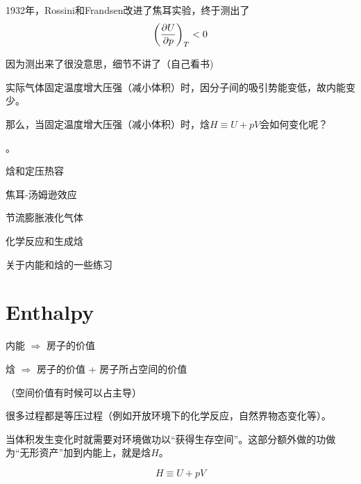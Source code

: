\documentclass[CJK]{beamer}
\begin{document}
\begin{frame}
\bch
1932年，Rossini和Frandsen改进了焦耳实验，终于测出了
$$\left(\frac{\partial U}{\partial p}\right)_{T} < 0 $$

因为测出来了很没意思，细节不讲了（自己看书\bye)
\ech
\end{frame}


\begin{frame}
\bch
实际气体固定温度增大压强（减小体积）时，因分子间的吸引势能变低，故内能变少。


那么，当固定温度增大压强（减小体积）时，焓$H\equiv U + pV$会如何变化呢？

\skipline

。

\ech
\end{frame}


\begin{frame}
\bch
\bitem
\item{焓和定压热容}
\item{焦耳-汤姆逊效应}
\item{节流膨胀液化气体}
\item{化学反应和生成焓}
\item{关于内能和焓的一些练习}
\eitem
\ech
\end{frame}

\section{Enthalpy}

\begin{frame}
\bch


\ech
\end{frame}

\begin{frame}
\bch

内能 $\Rightarrow$ 房子的价值

\skipline

焓 $\Rightarrow$ 房子的价值 + 房子所占空间的价值



（空间价值有时候可以占主导）


\ech
\end{frame}

\begin{frame}
\bch


很多过程都是等压过程（例如开放环境下的化学反应，自然界物态变化等）。

\hspace{0.1in}

当体积发生变化时就需要对环境做功以“获得生存空间”。这部分额外做的功做为“无形资产”加到内能上，就是焓$H$。

$$ H  \equiv U + pV$$ 

\ech
\end{frame}
\end{document}
